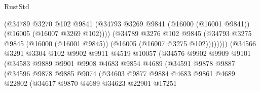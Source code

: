 \begin{lexlean}{RustStd}
\begin{coremodule}
                                      (@34789
                                        @3270
                                        @102
                                        @9841
                                        (@34793
                                          @3269
                                          @9841
                                          (@16000 (@16001 @9841))
                                          (@16005 (@16007 @3269 @102))))
                                      (@34789
                                        @3276
                                        @102
                                        @9845
                                        (@34793
                                          @3275
                                          @9845
                                          (@16000 (@16001 @9845))
                                          (@16005 (@16007 @3275 @102))))))))
                              (@34566
                                @3291
                                @3304
                                @102
                                @9902
                                @9911
                                @4519
                                @10057
                                (@34576
                                  @9902
                                  @9909
                                  @9101
                                  (@34583
                                    @9889
                                    @9901
                                    @9908
                                    @4683
                                    @9854
                                    @4689
                                    (@34591
                                      @9878
                                      @9887
                                      (@34596
                                        @9878
                                        @9885
                                        @9074
                                        (@34603
                                          @9877
                                          @9884
                                          @4683
                                          @9861
                                          @4689
                                          @22802
                                          (@34617
                                            @9870
                                            @4689
                                            @34623
                                            @22901
                                            @17251

\end{coremodule}
\end{lexlean}
